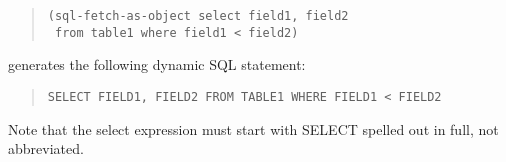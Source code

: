\begin{quote}
\begin{verbatim}
(sql-fetch-as-object select field1, field2 
 from table1 where field1 < field2)
\end{verbatim}
\end{quote}

generates the following dynamic SQL statement:

\begin{quote}
\begin{verbatim}
SELECT FIELD1, FIELD2 FROM TABLE1 WHERE FIELD1 < FIELD2
\end{verbatim}
\end{quote}

Note that the select expression must start with SELECT spelled out in
full, not abbreviated.

